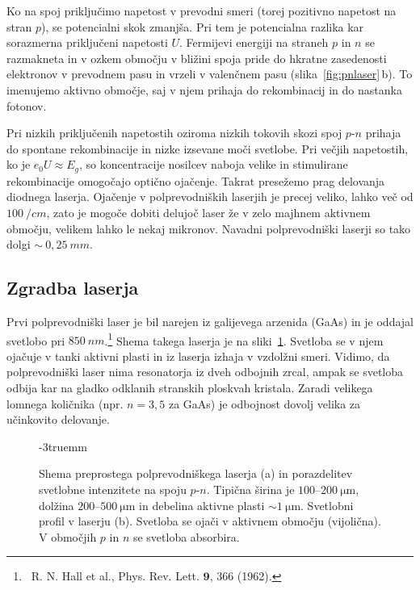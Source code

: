 Ko na spoj priključimo napetost v prevodni smeri (torej pozitivno napetost na stran
$p$), se potencialni skok zmanjša. Pri tem je potencialna razlika kar sorazmerna priključeni
napetosti $U$. Fermijevi energiji na straneh $p$ in $n$ se razmakneta in v
ozkem območju v bližini spoja pride do hkratne zasedenosti elektronov
v prevodnem pasu in vrzeli v valenčnem pasu (slika~\ref{fig:pnlaser}\,b). 
To imenujemo aktivno območje, saj v njem prihaja do rekombinacij in do nastanka fotonov. 

Pri nizkih 
priključenih napetostih oziroma nizkih tokovih skozi spoj $p$-$n$ prihaja
do spontane rekombinacije in nizke izsevane moči svetlobe. 
Pri večjih napetostih, ko je $e_0U \approx E_g$, so koncentracije nosilcev naboja velike in
stimulirane rekombinacije omogočajo optično ojačenje. Takrat presežemo prag delovanja
diodnega laserja. 
Ojačenje v polprevodniških laserjih je precej veliko, lahko več od 
$100~/\si{cm}$, zato je mogoče dobiti delujoč laser že v zelo majhnem aktivnem 
območju, velikem lahko le nekaj mikronov. Navadni polprevodniški laserji so tako 
dolgi $\sim~0,25~\si{mm}$.

\subsection*{Zgradba laserja}
Prvi polprevodniški laser je bil narejen iz galijevega arzenida (GaAs) in je oddajal svetlobo 
pri $850~\si{nm}$.\footnote{~R. N. Hall 
et al., Phys. Rev. Lett. $\mathbf{9}$, 366 (1962).} 
Shema takega laserja je na sliki~\ref{fig:pnshema}. Svetloba se v njem ojačuje
v tanki aktivni plasti in iz laserja izhaja v vzdolžni smeri. 
Vidimo, da polprevodniški laser nima resonatorja iz dveh odbojnih zrcal,
ampak se svetloba odbija kar na gladko odklanih stranskih ploskvah kristala. Zaradi
velikega lomnega količnika (npr. $n=3,5$ za GaAs) je odbojnost dovolj velika
za učinkovito delovanje.
\begin{figure}[ht]
\centering
\def\svgwidth{140truemm} 

\caption{Shema preprostega polprevodniškega laserja (a) in porazdelitev svetlobne
intenzitete na spoju $p$-$n$. Tipična širina je $100$--$200~\si{\micro\metre}$, 
dolžina $200$--$500~\si{\micro\metre}$ in debelina aktivne plasti  $\sim 1~\si{\micro\metre}$. 
Svetlobni profil v laserju (b). Svetloba 
se ojači v aktivnem območju (vijolična). V območjih $p$ in $n$ se svetloba absorbira.
}
\label{fig:pnshema}
\vglue-3truemm
\end{figure}

